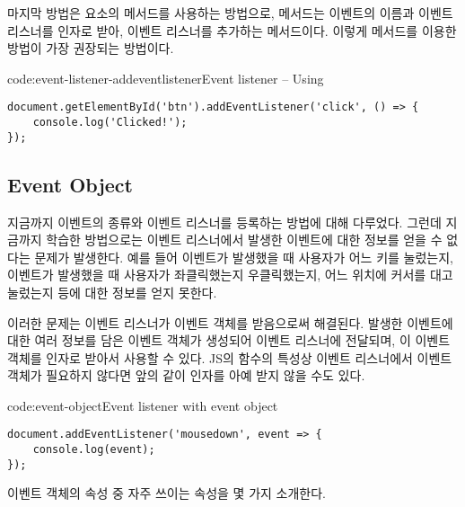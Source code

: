 마지막 방법은 요소의  메서드를 사용하는 방법으로,  메서드는 이벤트의 이름과 이벤트 리스너를 인자로 받아, 이벤트 리스너를 추가하는 메서드이다. 이렇게  메서드를 이용한 방법이 가장 권장되는 방법이다.

\begin{code}{code:event-listener-addeventlistener}{Event listener – Using }
\begin{verbatim}
document.getElementById('btn').addEventListener('click', () => {
    console.log('Clicked!');
});
\end{verbatim}
\end{code}

\subsection*{Event Object}

지금까지 이벤트의 종류와 이벤트 리스너를 등록하는 방법에 대해 다루었다. 그런데 지금까지 학습한 방법으로는 이벤트 리스너에서 발생한 이벤트에 대한 정보를 얻을 수 없다는 문제가 발생한다. 예를 들어  이벤트가 발생했을 때 사용자가 어느 키를 눌렀는지,  이벤트가 발생했을 때 사용자가 좌클릭했는지 우클릭했는지, 어느 위치에 커서를 대고 눌렀는지 등에 대한 정보를 얻지 못한다.

이러한 문제는 이벤트 리스너가 이벤트 객체를 받음으로써 해결된다. 발생한 이벤트에 대한 여러 정보를 담은 이벤트 객체가 생성되어 이벤트 리스너에 전달되며, 이 이벤트 객체를 인자로 받아서 사용할 수 있다. JS의 함수의 특성상 이벤트 리스너에서 이벤트 객체가 필요하지 않다면 앞의 \와 같이 인자를 아예 받지 않을 수도 있다.

\begin{code}{code:event-object}{Event listener with event object}
\begin{verbatim}
document.addEventListener('mousedown', event => {
    console.log(event);
});
\end{verbatim}
\end{code}

이벤트 객체의 속성 중 자주 쓰이는 속성을 몇 가지 소개한다.

